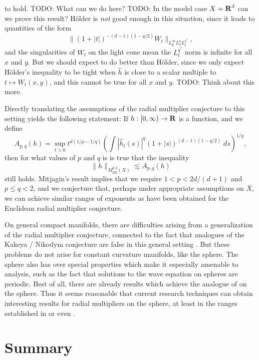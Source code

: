 %
to hold. TODO: What can we do here? TODO: In the model case $X = \operatorname{\mathbf{R}}^d$ can we prove this result? H\"{o}lder is \emph{not} good enough in this situation, since it leads to quantities of the form
%
\[ \| (1 + |t|)^{-(d-1)(1 - q/2)} W_t \|_{L^\infty_y L^q_x L^{q^*}_t}, \]
%
and the singularities of $W_t$ on the light cone mean the $L^{q^*}_t$ norm is infinite for all $x$ and $y$. But we should expect to do better than H\"{o}lder, since we only expect H\"{o}lder's inequality to be tight when $\widehat{h}$ is close to a scalar multiple to $t \mapsto W_t(x,y)$, and this cannot be true for all $x$ and $y$. TODO: Think about this more.

Directly translating the assumptions of the radial multiplier conjecture to this setting yields the following statement: If $h: [0,\infty) \to \operatorname{\mathbf{R}}$ is a function, and we define
%
\[ A_{p,q}(h) = \sup_{t > 0} t^{d(1/p - 1/q)} \left( \int |\widehat{h}_t(s)|^q (1 + |s|)^{(d-1)(1 - q/2)}\; ds \right)^{1/q}, \]
%
then for what values of $p$ and $q$ is is true that the inequality
%
\[ \| h \|_{M^{p,q}_{\text{Dil}}(X)} \lesssim A_{p,q}(h) \]
%
still holds. Mitjagin's result implies that we require $1 < p < 2d/(d+1)$ and $p \leq q < 2$, and we conjecture that, perhaps under appropriate assumptions on $X$, we can achieve similar ranges of exponents as have been obtained for the Euclidean radial multiplier conjecture.

On general compact manifolds, there are difficulties arising from a generalization of the radial multiplier conjecture, connected to the fact that analogues of the Kakeya / Nikodym conjecture are false in this general setting \cite{Minicozzi}. But these problems do not arise for constant curvature manifolds, like the sphere. The sphere also has over special properties which make it especially amenable to analysis, such as the fact that solutions to the wave equation on spheres are periodic. Best of all, there are already results which achieve the analogue of \cite{GarrigosandSeeger} on the sphere. Thus it seems reasonable that current research techniques can obtain interesting results for radial multipliers on the sphere, at least in the ranges established in \cite{HeoandNazarovandSeeger} or even \cite{Cladek}.

\section{Summary}

